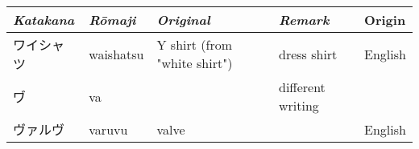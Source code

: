 \newpage
\Padding
\begin{longtable}[c]{p{2cm}p{2.5cm}p{4.5cm}p{3cm}p{3cm}}
\textit{Katakana}&\textit{Rōmaji}&\textit{Original}&\textit{Remark}&Origin\\\hline
ワイシャツ  &waishatsu &Y shirt (from "white shirt")&dress shirt           &English\\
ヷ          &va        &                            &different writing     &\\
ヴァルヴ    &varuvu    &valve                       &                      &English\\
\end{longtable}



\newpage
